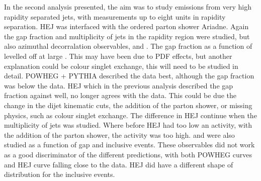 In the second analysis presented, the aim was to study emissions from very high rapidity separated jets, with measurements up to eight units in rapidity separation.
HEJ was interfaced with the \pt{} ordered parton shower Ariadne.
Again the gap fraction and multiplicity of jets in the rapidity region were studied, but also azimuthal decorralation observables, \mean{\cosdphi} and \mean{\costwodphi}.
The gap fraction as a function of \dy{} levelled off at large \dy{}. 
This may have been due to PDF effects, but another explanation could be colour singlet exchange, this will need to be studied in detail.
POWHEG + PYTHIA described the data best, although the gap fraction was below the data.
HEJ which in the previous analysis described the gap fraction against \dy{} well, no longer agrees with the data. 
This could be due the change in the dijet kinematic cuts, the addition of the parton shower, or missing physics, such as colour singlet exchange.
The difference in HEJ continue when the multiplicity of jets was studied.
Where before HEJ had too low an activity, with the addition of the parton shower, the activity was too high.
\mean{\cosdphi} and \mean{\costwodphi} were also studied as a function of gap and inclusive events.
These observables did not work as a good discriminator of the different predictions, with both POWHEG curves and HEJ curve falling close to the data.
HEJ did have a different shape of distribution for the inclusive events.



